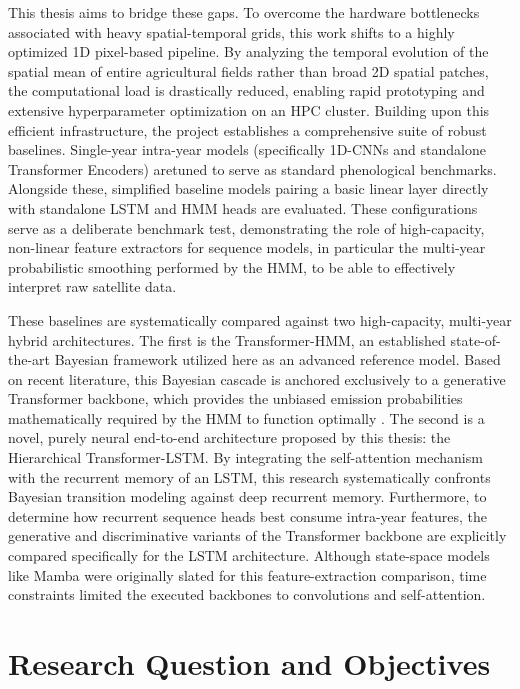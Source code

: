 This thesis aims to bridge these gaps. To overcome the hardware bottlenecks associated with heavy spatial-temporal grids,
this work shifts to a highly optimized 1D pixel-based pipeline.
By analyzing the temporal evolution of the spatial mean of entire agricultural fields rather than broad 2D spatial patches,
the computational load is drastically reduced, enabling rapid prototyping and extensive hyperparameter optimization on an HPC cluster.
Building upon this efficient infrastructure, the project establishes a comprehensive suite of robust baselines. 
Single-year intra-year models (specifically 1D-CNNs and standalone Transformer Encoders) aretuned to serve as standard phenological benchmarks.
Alongside these, simplified baseline models pairing a basic linear layer directly with standalone
LSTM \cite{hochreiter_long_1997} and HMM \cite{rabiner_tutorial_1989} heads are evaluated. 
These configurations serve as a deliberate benchmark test, demonstrating the role of high-capacity,
non-linear feature extractors for sequence models, in particular the multi-year probabilistic smoothing
performed by the HMM, to be able to effectively interpret raw satellite data.

These baselines are systematically compared against two high-capacity, multi-year hybrid architectures. 
The first is the Transformer-HMM, an established state-of-the-art Bayesian framework \cite{perantoni_bayesian_2024} utilized here as an advanced reference model.
Based on recent literature, this Bayesian cascade is anchored exclusively to a generative Transformer backbone,
which provides the unbiased emission probabilities mathematically required by the HMM to function optimally \cite{perantoni_bayesian_2024}.
The second is a novel, purely neural end-to-end architecture proposed by this thesis: the Hierarchical Transformer-LSTM. 
By integrating the self-attention mechanism \cite{attention_is_all_you_need, garnot2020psetae} with the recurrent memory of an LSTM,
this research systematically confronts Bayesian transition modeling against deep recurrent memory. 
Furthermore, to determine how recurrent sequence heads best consume intra-year features,
the generative and discriminative variants of the Transformer backbone are explicitly compared specifically for the LSTM architecture.
Although state-space models like Mamba \cite{gu_mamba_2023} were originally slated for this feature-extraction comparison,
time constraints limited the executed backbones to convolutions and self-attention.


\section{Research Question and Objectives}
\label{sec:question_objectives}

